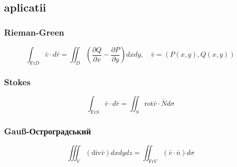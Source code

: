 \documentclass{article}
\newcommand{\parti}[2]{\frac{\partial #1}{ \partial #2}}
\renewcommand*{\div}{\mathrm{div}}
\newcommand*{\rot}{\mathrm{rot}}
\newcommand*{\Fr}{\mathrm{Fr}}
\begin{document}
\subsection*{aplicatii}
\subsubsection*{Rieman-Green}
\[ \int_{\Fr D} \bar v \cdot d\bar{r} = \iint_D \left( \parti{Q}{x} - \parti{P}{y} \right) dx dy, \quad \bar{v} = (P(x,y), Q(x,y)) \]
\subsubsection*{Stokes}
\[ \int_{\Fr S} \bar v \cdot d \bar r = \iint_S \rot \bar v \cdot \bar N d \sigma \]
\subsubsection*{Gauß-Остроградський}
\[\iiint_V (\div \bar v) dx dy dz = \iint_{\Fr V} (\bar v \cdot \bar n) d\sigma \]
\end{document}
